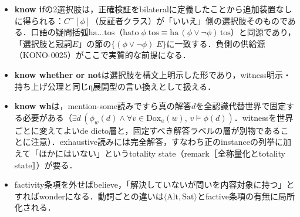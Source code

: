 \documentclass[../../main-detail.tex]{subfiles}
\begin{document}
\begin{itemize}
    \item \textbf{know if}の2選択肢は，正確検証をbilateralに定義したことから追加装置なしに得られる：$C^-[\phi]$（反証者クラス）が「いいえ」側の選択肢そのものである．口語の疑問括弧$\mathrm{ha}\ldots\mathrm{tos}$（$\mathrm{hato}\;\phi\;\mathrm{tos} \equiv \mathrm{ha}\,(\phi\lor\lnot\phi)\,\mathrm{tos}$）と同源であり，「選択肢と冠詞$E$」の節の$\{(\phi\lor\lnot\phi)\; E\}$に一致する．負側の供給源（KONO-0025）がここで実質的な前提になる．
    \item \textbf{know whether or not}は選択肢を構文上明示した形であり，witness明示・持ち上げ公理と同じη展開型の言い換えとして扱える．
    \item \textbf{know wh}は，mention-some読みですら真の解答$d$を全認識代替世界で固定する必要がある（$\exists d\,(\phi_w(d) \land \forall v\in\mathrm{Dox}_a(w),\, v \models \phi(d))$．witnessを世界ごとに変えてよいde dicto層と，固定すべき解答ラベルの層が別物であることに注意）．exhaustive読みには完全解答，すなわち正のinstanceの列挙に加えて「ほかにはいない」というtotality state（remark［全称量化とtotality state］）が要る．
    \item factivity条項を外せばbelieve，「解決していないが問いを内容対象に持つ」とすればwonderになる．動詞ごとの違いは$\langle\mathrm{Alt},\mathrm{Sat}\rangle$とfactive条項の有無に局所化される．
\end{itemize}
\end{document}
